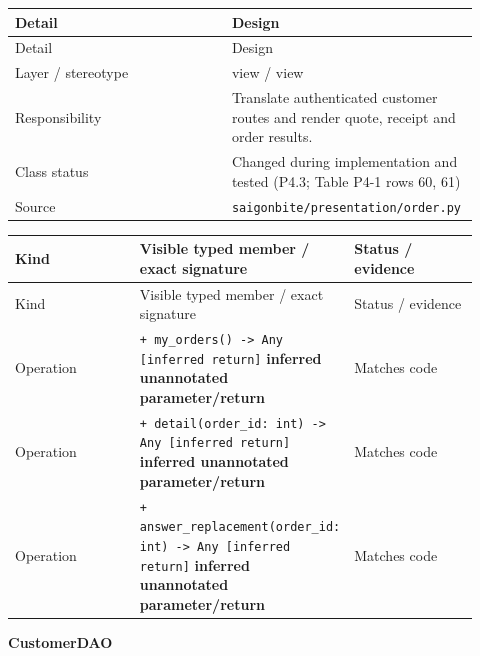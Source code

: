 \begin{longtable}{>{\raggedright\arraybackslash}p{0.4600\linewidth}>{\raggedright\arraybackslash}p{0.4600\linewidth}}
Detail & Design \\
\hline\endfirsthead
Detail & Design \\
\hline\endhead
Layer / stereotype & view / \guillemotleft{}view\guillemotright{} \\
Responsibility & Translate authenticated customer routes and render quote, receipt and order results. \\
Class status & Changed during implementation and tested (P4.3; Table P4-1 rows 60, 61) \\
Source & \texttt{saigonbite/\allowbreak{}presentation/\allowbreak{}order.\allowbreak{}py} \\
\end{longtable}
\begin{longtable}{>{\raggedright\arraybackslash}p{0.3067\linewidth}>{\raggedright\arraybackslash}p{0.3067\linewidth}>{\raggedright\arraybackslash}p{0.3067\linewidth}}
Kind & Visible typed member / exact signature & Status / evidence \\
\hline\endfirsthead
Kind & Visible typed member / exact signature & Status / evidence \\
\hline\endhead
Operation & \texttt{+ my\_\allowbreak{}orders() -\textgreater{} Any [inferred return]} \textbf{inferred unannotated parameter/return} & Matches code \\
Operation & \texttt{+ detail(order\_\allowbreak{}id: int) -\textgreater{} Any [inferred return]} \textbf{inferred unannotated parameter/return} & Matches code \\
Operation & \texttt{+ answer\_\allowbreak{}replacement(order\_\allowbreak{}id: int) -\textgreater{} Any [inferred return]} \textbf{inferred unannotated parameter/return} & Matches code \\
\end{longtable}
\textbf{CustomerDAO}

